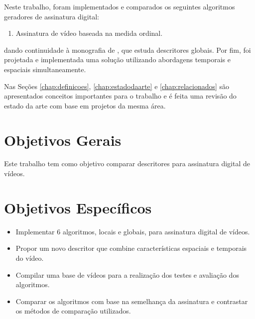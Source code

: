     Neste trabalho, foram implementados e comparados os seguintes algoritmos geradores de assinatura digital: 
    \begin{enumerate}
    \item Assinatura de vídeo baseada na medida ordinal.
    \end{enumerate}
    
    dando continuidade à monografia de \cite{sylvio2015}, que estuda descritores globais. Por fim, foi projetada e implementada uma solução utilizando abordagens temporais e espaciais simultaneamente.
    

Nas Seções \ref{chap:definicoes}, \ref{chap:estadodaarte} e \ref{chap:relacionados} são apresentados conceitos importantes para o trabalho e é feita uma revisão do estado da arte com base em projetos da mesma área.


\section{Objetivos Gerais}
Este trabalho tem como objetivo comparar descritores para assinatura digital de vídeos.

\section{Objetivos Específicos}
\begin{itemize}
\item Implementar 6 algoritmos, locais e globais, para assinatura digital de vídeos.
\item Propor um novo descritor que combine características espaciais e temporais do vídeo.
\item Compilar uma base de vídeos para a realização dos testes e avaliação dos algoritmos.
\item Comparar os algoritmos com base na semelhança da assinatura e contrastar os métodos de comparação utilizados.
\end{itemize}
